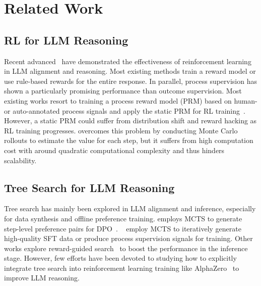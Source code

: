 \section{Related Work}

\subsection{RL for LLM Reasoning}
Recent advanced~\citep{guo2025deepseek,zhu2024deepseek,openaio1,ouyang2022training} have demonstrated the effectiveness of reinforcement learning in LLM alignment and reasoning. Most existing methods train a reward model or use rule-based rewards for the entire response. In parallel, process supervision\citep{lightman2023letsverifystepstep} has shown a particularly promising performance than outcome supervision. 
Most existing works resort to training a process reward model (PRM) based on human- or auto-annotated process signals\citep{lightman2023letsverifystepstep, wang2024mathshepherdverifyreinforcellms,luo2024improvemathematicalreasoninglanguage,setlur2024rewardingprogressscalingautomated} and apply the static PRM for RL training~\citep{shao2024deepseekmathpushinglimitsmathematical,wang2024mathshepherdverifyreinforcellms}. However, a static PRM could suffer from distribution shift and reward hacking as RL training progresses. \citep{kazemnejad2024vineppounlockingrlpotential} overcomes this problem by conducting Monte Carlo rollouts to estimate the value for each step, but it suffers from high computation cost with around quadratic computational complexity and thus hinders scalability. 


\subsection{Tree Search for LLM Reasoning}
Tree search has mainly been explored in LLM alignment and inference, especially for data synthesis and offline preference training.
\citet{xie2024monte} employs MCTS to generate step-level preference pairs for DPO~\citep{rafailov2024direc}. ~\citet{chen2024alphamathzeroprocesssupervision,feng2024alphazeroliketreesearchguidelarge,zhang2024restmctsllmselftrainingprocess} employ MCTS to iteratively generate high-quality SFT data or produce process supervision signals for training. Other works explore reward-guided search~\citep{snell2024scalingllmtesttimecompute,yao2023treethoughtsdeliberateproblem,long2023largelanguagemodelguided} to boost the performance in the inference stage.  
However, few efforts have been devoted to studying how to explicitly integrate tree search into reinforcement learning training like AlphaZero~\citep{silver2017mastering} to improve LLM reasoning.












